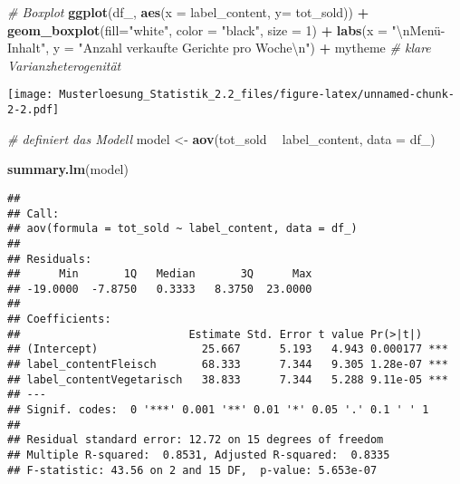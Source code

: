 \documentclass[]{article}
\newenvironment{Shaded}{\begin{snugshade}}{\end{snugshade}}
\newcommand{\KeywordTok}[1]{\textcolor[rgb]{0.13,0.29,0.53}{\textbf{#1}}}
\newcommand{\DataTypeTok}[1]{\textcolor[rgb]{0.13,0.29,0.53}{#1}}
\newcommand{\DecValTok}[1]{\textcolor[rgb]{0.00,0.00,0.81}{#1}}
\newcommand{\CharTok}[1]{\textcolor[rgb]{0.31,0.60,0.02}{#1}}
\newcommand{\StringTok}[1]{\textcolor[rgb]{0.31,0.60,0.02}{#1}}
\newcommand{\CommentTok}[1]{\textcolor[rgb]{0.56,0.35,0.01}{\textit{#1}}}
\newcommand{\OperatorTok}[1]{\textcolor[rgb]{0.81,0.36,0.00}{\textbf{#1}}}
\newcommand{\NormalTok}[1]{#1}
\begin{document}
\begin{Shaded}
\begin{Highlighting}[]
\CommentTok{# Boxplot}
\KeywordTok{ggplot}\NormalTok{(df_, }\KeywordTok{aes}\NormalTok{(}\DataTypeTok{x =}\NormalTok{ label_content, }\DataTypeTok{y=}\NormalTok{ tot_sold)) }\OperatorTok{+}
\StringTok{  }\KeywordTok{geom_boxplot}\NormalTok{(}\DataTypeTok{fill=}\StringTok{"white"}\NormalTok{, }\DataTypeTok{color =} \StringTok{"black"}\NormalTok{, }\DataTypeTok{size =} \DecValTok{1}\NormalTok{) }\OperatorTok{+}
\StringTok{  }\KeywordTok{labs}\NormalTok{(}\DataTypeTok{x =} \StringTok{"}\CharTok{\textbackslash{}n}\StringTok{Menü-Inhalt"}\NormalTok{, }\DataTypeTok{y =} \StringTok{"Anzahl verkaufte Gerichte pro Woche}\CharTok{\textbackslash{}n}\StringTok{"}\NormalTok{) }\OperatorTok{+}
\StringTok{  }\NormalTok{mytheme }\CommentTok{# klare Varianzheterogenität}
\end{Highlighting}
\end{Shaded}

\texttt{[image: Musterloesung\_Statistik\_2.2\_files/figure-latex/unnamed-chunk-2-2.pdf]}

\begin{Shaded}
\begin{Highlighting}[]
\CommentTok{# definiert das Modell}
\NormalTok{model <-}\StringTok{ }\KeywordTok{aov}\NormalTok{(tot_sold }\OperatorTok{~}\StringTok{ }\NormalTok{label_content, }\DataTypeTok{data =}\NormalTok{ df_)}

\KeywordTok{summary.lm}\NormalTok{(model)}
\end{Highlighting}
\end{Shaded}

\begin{verbatim}
## 
## Call:
## aov(formula = tot_sold ~ label_content, data = df_)
## 
## Residuals:
##      Min       1Q   Median       3Q      Max 
## -19.0000  -7.8750   0.3333   8.3750  23.0000 
## 
## Coefficients:
##                          Estimate Std. Error t value Pr(>|t|)    
## (Intercept)                25.667      5.193   4.943 0.000177 ***
## label_contentFleisch       68.333      7.344   9.305 1.28e-07 ***
## label_contentVegetarisch   38.833      7.344   5.288 9.11e-05 ***
## ---
## Signif. codes:  0 '***' 0.001 '**' 0.01 '*' 0.05 '.' 0.1 ' ' 1
## 
## Residual standard error: 12.72 on 15 degrees of freedom
## Multiple R-squared:  0.8531, Adjusted R-squared:  0.8335 
## F-statistic: 43.56 on 2 and 15 DF,  p-value: 5.653e-07
\end{verbatim}
\end{document}
